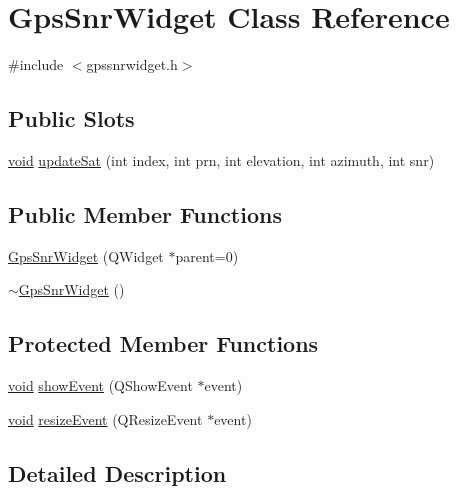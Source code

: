 \hypertarget{class_gps_snr_widget}{\section{\-Gps\-Snr\-Widget \-Class \-Reference}
\label{class_gps_snr_widget}
}


{\ttfamily \#include $<$gpssnrwidget.\-h$>$}

\subsection*{\-Public \-Slots}
\begin{DoxyCompactItemize}
\item 
\hyperlink{group___u_a_v_objects_plugin_ga444cf2ff3f0ecbe028adce838d373f5c}{void} \hyperlink{class_gps_snr_widget_a6dbf80e15de8677ffd302e6e7f0819b1}{update\-Sat} (int index, int prn, int elevation, int azimuth, int snr)
\end{DoxyCompactItemize}
\subsection*{\-Public \-Member \-Functions}
\begin{DoxyCompactItemize}
\item 
\hyperlink{class_gps_snr_widget_a7ea7b55afc5cd80d895ea0150d16f10b}{\-Gps\-Snr\-Widget} (\-Q\-Widget $\ast$parent=0)
\item 
\hyperlink{class_gps_snr_widget_a81e2e0638608c2aaee946080fa3c5101}{$\sim$\-Gps\-Snr\-Widget} ()
\end{DoxyCompactItemize}
\subsection*{\-Protected \-Member \-Functions}
\begin{DoxyCompactItemize}
\item 
\hyperlink{group___u_a_v_objects_plugin_ga444cf2ff3f0ecbe028adce838d373f5c}{void} \hyperlink{class_gps_snr_widget_aa0c51f0c7ba8ee55f5ddc39b3a00c232}{show\-Event} (\-Q\-Show\-Event $\ast$event)
\item 
\hyperlink{group___u_a_v_objects_plugin_ga444cf2ff3f0ecbe028adce838d373f5c}{void} \hyperlink{class_gps_snr_widget_a0590fc0d2e8dc75bb780adc0d546631a}{resize\-Event} (\-Q\-Resize\-Event $\ast$event)
\end{DoxyCompactItemize}


\subsection{\-Detailed \-Description}


